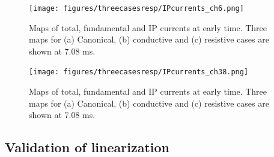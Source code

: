 \documentclass[a4paper, 11pt]{article}
\begin{document}
\begin{figure}[htb]
  \centering  \texttt{[image: figures/threecasesresp/IPcurrents\_ch6.png]}
  \caption{Maps of total, fundamental and IP currents at early time. Three maps for  (a) Canonical, (b) conductive and (c) resistive cases are shown at 7.08 ms.}
  \label{F:IPcurrents1}
\end{figure}
\begin{figure}[htb]
  \centering  \texttt{[image: figures/threecasesresp/IPcurrents\_ch38.png]}
  \caption{Maps of total, fundamental and IP currents at early time. Three maps for  (a) Canonical, (b) conductive and (c) resistive cases are shown at 7.08 ms.}
  \label{F:IPcurrents2}
\end{figure}

\subsection{Validation of linearization}

\end{document}
